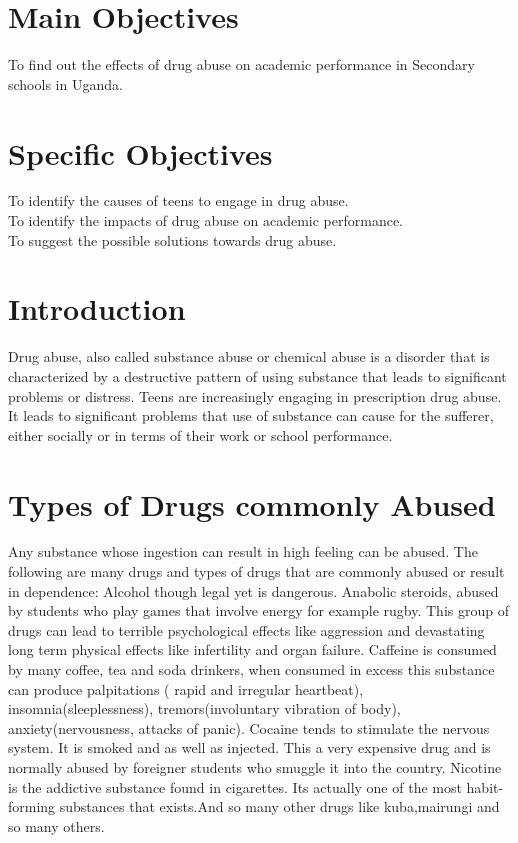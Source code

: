 \documentclass{article}
\begin{document}
\section{Main Objectives}
To find out the effects of drug abuse on academic performance in Secondary schools in Uganda.
\section{Specific Objectives}
To identify the causes of teens to engage in drug abuse.\\
To identify the impacts of drug abuse on academic performance.\\
To suggest the possible solutions towards drug abuse.
\section{Introduction}\label{sec:intro}
Drug abuse, also called substance abuse or chemical abuse is a disorder that is characterized by a destructive pattern of using substance that leads to significant problems or distress. Teens are increasingly engaging in prescription drug abuse. It leads to significant problems that use of substance can cause for the sufferer, either socially or in terms of their work or school performance. 
\section{Types of Drugs commonly Abused}
Any substance whose ingestion can result in high feeling can be abused. The following are many drugs and types of drugs that are commonly abused or result in dependence:
Alcohol though legal yet is dangerous. Anabolic steroids, abused by students who play games that involve energy for example rugby. This group of drugs can lead to terrible psychological  effects like aggression and devastating long term physical effects like infertility and organ failure. Caffeine  is consumed by many coffee, tea and soda drinkers, when consumed in excess this substance can produce palpitations ( rapid and irregular heartbeat), insomnia(sleeplessness), tremors(involuntary vibration of body), anxiety(nervousness, attacks of panic). Cocaine tends to stimulate the nervous system. It is smoked and as well as injected. This a very expensive drug and is normally abused by foreigner students who smuggle it into the country. Nicotine  is the addictive substance found in cigarettes. Its actually one of the most habit-forming substances that exists.And so many other drugs like kuba,mairungi and so many others.
\end{document}
